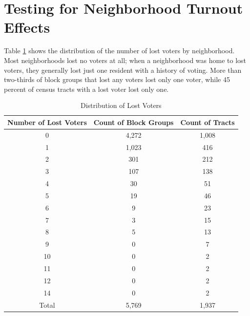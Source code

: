 \documentclass[12pt,]{article}
\begin{document}
\hypertarget{testing-for-neighborhood-turnout-effects}{%
\section*{Testing for Neighborhood Turnout Effects}\label{testing-for-neighborhood-turnout-effects}}

Table \ref{tab:nhood-dist} shows the distribution of the number of lost voters by neighborhood. Most neighborhoods lost no voters at all; when a neighborhood was home to lost voters, they generally lost just one resident with a history of voting. More than two-thirds of block groups that lost any voters lost only one voter, while 45 percent of census tracts with a lost voter lost only one.

\begin{table}[H]

\caption{\label{tab:distribution-lost}\label{tab:nhood-dist} Distribution of Lost Voters}
\centering
\fontsize{10}{12}\selectfont
\begin{tabular}[t]{ccc}
\toprule
Number of Lost Voters & Count of Block Groups & Count of Tracts\\
\midrule
0 & 4,272 & 1,008\\
1 & 1,023 & 416\\
2 & 301 & 212\\
3 & 107 & 138\\
4 & 30 & 51\\
5 & 19 & 46\\
6 & 9 & 23\\
7 & 3 & 15\\
8 & 5 & 13\\
9 & 0 & 7\\
10 & 0 & 2\\
11 & 0 & 2\\
12 & 0 & 2\\
14 & 0 & 2\\
\hline
Total & 5,769 & 1,937\\
\bottomrule
\end{tabular}
\end{table}
\end{document}
